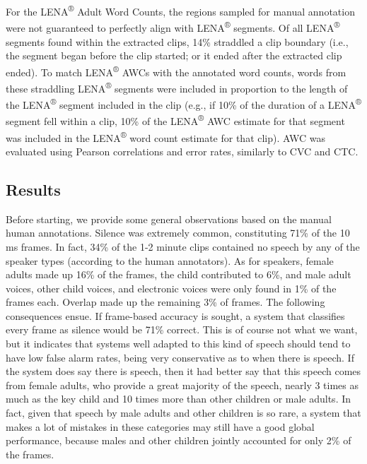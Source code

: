 \documentclass[english,floatsintext,man]{apa6}
\begin{document}
For the LENA\textsuperscript{®} Adult Word Counts, the regions sampled
for manual annotation were not guaranteed to perfectly align with
LENA\textsuperscript{®} segments. Of all LENA\textsuperscript{®}
segments found within the extracted clips, 14\% straddled a clip
boundary (i.e., the segment began before the clip started; or it ended
after the extracted clip ended). To match LENA\textsuperscript{®} AWCs
with the annotated word counts, words from these straddling
LENA\textsuperscript{®} segments were included in proportion to the
length of the LENA\textsuperscript{®} segment included in the clip
(e.g., if 10\% of the duration of a LENA\textsuperscript{®} segment fell
within a clip, 10\% of the LENA\textsuperscript{®} AWC estimate for that
segment was included in the LENA\textsuperscript{®} word count estimate
for that clip). AWC was evaluated using Pearson correlations and error
rates, similarly to CVC and CTC.

\subsection{Results}\label{results}

Before starting, we provide some general observations based on the
manual human annotations. Silence was extremely common, constituting
71\% of the 10 ms frames. In fact, 34\% of the 1-2 minute clips
contained no speech by any of the speaker types (according to the human
annotators). As for speakers, female adults made up 16\% of the frames,
the child contributed to 6\%, and male adult voices, other child voices,
and electronic voices were only found in 1\% of the frames each. Overlap
made up the remaining 3\% of frames. The following consequences ensue.
If frame-based accuracy is sought, a system that classifies every frame
as silence would be 71\% correct. This is of course not what we want,
but it indicates that systems well adapted to this kind of speech should
tend to have low false alarm rates, being very conservative as to when
there is speech. If the system does say there is speech, then it had
better say that this speech comes from female adults, who provide a
great majority of the speech, nearly 3 times as much as the key child
and 10 times more than other children or male adults. In fact, given
that speech by male adults and other children is so rare, a system that
makes a lot of mistakes in these categories may still have a good global
performance, because males and other children jointly accounted for only
2\% of the frames.
\end{document}
